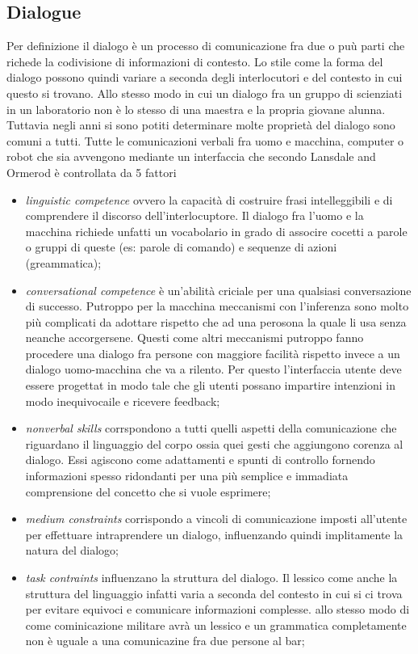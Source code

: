 \documentclass{thesisreport}
\begin{document}
 \subsection{Dialogue}
 Per definizione il dialogo è un processo di comunicazione fra due o puù parti che richede la codivisione di informazioni di contesto. Lo stile come la forma del dialogo possono quindi variare a seconda degli interlocutori e del contesto in cui questo si trovano. Allo stesso modo in cui un dialogo fra un gruppo di scienziati in un laboratorio non è lo stesso di una maestra e la propria giovane alunna.
 Tuttavia negli anni si sono potiti determinare molte proprietà del dialogo sono comuni a tutti. 
 Tutte le comunicazioni verbali fra uomo e macchina, computer o robot che sia avvengono mediante un interfaccia che secondo Lansdale and Ormerod  è controllata da 5 fattori 
 \begin{itemize}
     \item \textit{linguistic competence} ovvero la capacità di costruire frasi intelleggibili e di comprendere il discorso dell'interlocuptore. Il dialogo fra l'uomo e la macchina richiede unfatti un vocabolario in grado di associre cocetti a parole o gruppi di queste (es: parole di comando) e sequenze di azioni (greammatica);
     \item \textit{conversational competence} è un'abilità criciale per una qualsiasi conversazione di successo. Putroppo per la macchina meccanismi con l'inferenza sono molto più complicati da adottare rispetto che ad una perosona la quale li usa senza neanche accorgersene. Questi come altri meccanismi putroppo fanno procedere una dialogo fra persone con maggiore facilità rispetto invece a un dialogo uomo-macchina che va a rilento. Per questo l'interfaccia utente deve essere progettat in modo tale che gli utenti possano impartire intenzioni in modo inequivocaile e ricevere feedback;
     \item \textit{nonverbal skills} corrspondono a tutti quelli aspetti della comunicazione che riguardano il linguaggio del corpo ossia quei gesti che aggiungono corenza al dialogo. Essi agiscono come adattamenti e spunti di controllo fornendo informazioni spesso ridondanti per una più semplice e immadiata comprensione del concetto che si vuole esprimere;
     \item \textit{medium constraints} corrispondo a vincoli di comunicazione imposti all'utente per effettuare intraprendere un dialogo, influenzando quindi implitamente la natura del dialogo; 
     \item \textit{task contraints} influenzano la struttura del dialogo. Il lessico come anche la struttura del linguaggio infatti varia a seconda del contesto in cui si ci trova per evitare equivoci e comunicare informazioni complesse. allo stesso modo di come cominicazione militare avrà un lessico e un grammatica completamente non è uguale a una comunicazine fra due persone al bar;
 \end{itemize}
\end{document}
